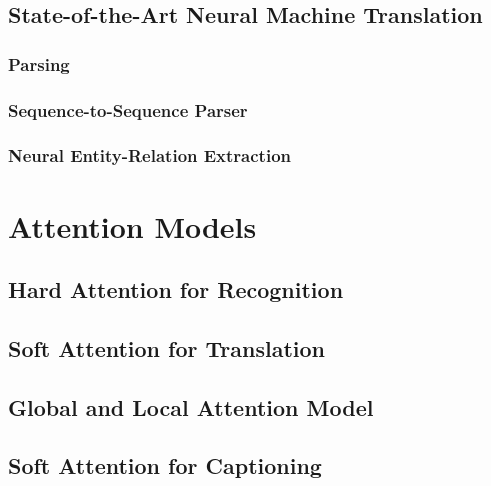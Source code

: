 		\subsection{State-of-the-Art Neural Machine Translation} %

			\subsubsection{Parsing} %

			\subsubsection{Sequence-to-Sequence Parser} %

			\subsubsection{Neural Entity-Relation Extraction} %

	\section{Attention Models} %

		\subsection{Hard Attention for Recognition} %

		\subsection{Soft Attention for Translation} %

		\subsection{Global and Local Attention Model} %

		\subsection{Soft Attention for Captioning} %

